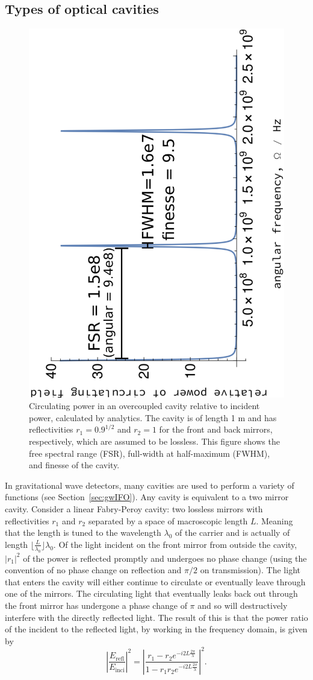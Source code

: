 \documentclass[aps,pra,superscriptaddress,reprint,nofootinbib]{revtex4-1}
\newcommand{\abs}[1]{\left\lvert #1 \right\rvert}
\begin{document}
\subsection{Types of optical cavities}

\begin{figure}[h]
	\begin{center}
	\includegraphics[height=0.45\textwidth, angle=-90]{figures/cavity_fsr_fwhm_finesse.pdf}
	\end{center}
	\caption{Circulating power in an overcoupled cavity relative to incident power, calculated by analytics. The cavity is of length 1 m and has reflectivities $r_1 = 0.9^{1/2}$ and $r_2 = 1$ for the front and back mirrors, respectively, which are assumed to be lossless. This figure shows the free spectral range (FSR), full-width at half-maximum (FWHM), and finesse of the cavity.}
	\label{fig:cavity_fsr_fwhm_finesse}
\end{figure}

In gravitational wave detectors, many cavities are used to perform a variety of functions (see Section~\ref{sec:gwIFO}). Any cavity is equivalent to a two mirror cavity. Consider a linear Fabry-Peroy cavity: two lossless mirrors with reflectivities $r_1$ and $r_2$ separated by a space of macroscopic length $L$. Meaning that the length is tuned to the wavelength $\lambda_0$ of the carrier and is actually of length $\lfloor \frac{L}{\lambda_0} \rfloor \lambda_0$. Of the light incident on the front mirror from outside the cavity, $\abs{r_1}^2$ of the power is reflected promptly and undergoes no phase change (using the convention of no phase change on reflection and $\pi/2$ on transmission). The light that enters the cavity will either continue to circulate or eventually leave through one of the mirrors. The circulating light that eventually leaks back out through the front mirror has undergone a phase change of $\pi$ and so will destructively interfere with the directly reflected light. The result of this is that the power ratio of the incident to the reflected light, by working in the frequency domain, is given by~\cite{Danilishin_2012}
\begin{equation}
\label{eq:refl_field_amp}
\abs{\frac{E_{\mathrm{refl}}}{E_{\mathrm{inci}}}}^2 = \abs{\frac{r_1 - r_2 e^{-i 2 L \frac{2\pi}{\lambda}}}{1- r_1 r_2 e^{-i 2 L \frac{2\pi}{\lambda}}}}^2.
\end{equation}
\end{document}
